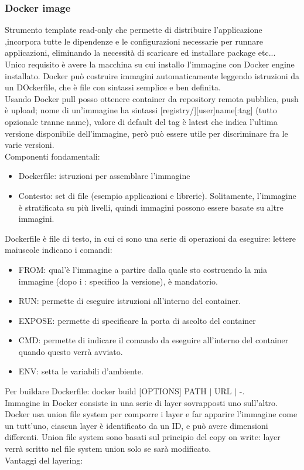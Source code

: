 \documentclass{article}
\begin{document}
\subsubsection{Docker image}
Strumento template read-only che permette di distribuire l'applicazione ,incorpora tutte le dipendenze e le configurazioni necessarie per runnare applicazioni, eliminando la necessità di scaricare ed installare package etc...\\ Unico requisito è avere la macchina su cui installo l'immagine con Docker engine installato. Docker può costruire immagini automaticamente leggendo istruzioni da un DOckerfile, che è file con sintassi semplice e ben definita.\\
Usando Docker pull posso ottenere container da repository remota pubblica, push è upload; nome di un'immagine ha sintassi [registry/][user]name[:tag] (tutto opzionale tranne name), valore di default del tag è latest che indica l'ultima versione disponibile dell'immagine, però può essere utile per discriminare fra le varie versioni.\\ Componenti fondamentali:
\begin{itemize}
\item Dockerfile: istruzioni per assemblare l'immagine
\item Contesto: set di file (esempio applicazioni e librerie). Solitamente, l'immagine è stratificata su più livelli, quindi immagini possono essere basate su altre immagini.
\end{itemize}
Dockerfile è file di testo, in cui ci sono una serie di operazioni da eseguire: lettere maiuscole indicano i comandi:
\begin{itemize}
\item FROM: qual'è l'immagine a partire dalla quale sto costruendo la mia immagine (dopo i : specifico la versione), è mandatorio.
\item RUN: permette di eseguire istruzioni all'interno del container.
\item EXPOSE: permette di specificare la porta di ascolto del container
\item CMD: permette di indicare il comando da eseguire all'interno del container quando questo verrà avviato.
\item ENV: setta le variabili d'ambiente.
\end{itemize}
Per buildare Dockerfile: docker build [OPTIONS] PATH $|$ URL $|$ -.\\ Immagine in Docker consiste in una serie di layer sovrapposti uno sull'altro. Docker usa union file system per comporre i layer e far apparire l'immagine come un tutt'uno, ciascun layer è identificato da un ID, e può avere dimensioni differenti. Union file system sono basati sul principio del copy on write: layer verrà scritto nel file system union solo se sarà modificato.\\ Vantaggi del layering:
\end{document}
